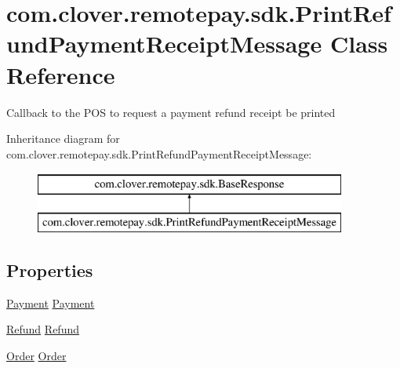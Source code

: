 \hypertarget{classcom_1_1clover_1_1remotepay_1_1sdk_1_1_print_refund_payment_receipt_message}{}\section{com.\+clover.\+remotepay.\+sdk.\+Print\+Refund\+Payment\+Receipt\+Message Class Reference}
\label{classcom_1_1clover_1_1remotepay_1_1sdk_1_1_print_refund_payment_receipt_message}


Callback to the P\+OS to request a payment refund receipt be printed  


Inheritance diagram for com.\+clover.\+remotepay.\+sdk.\+Print\+Refund\+Payment\+Receipt\+Message\+:\begin{figure}[H]
\begin{center}
\leavevmode
\includegraphics[height=2.000000cm]{classcom_1_1clover_1_1remotepay_1_1sdk_1_1_print_refund_payment_receipt_message}
\end{center}
\end{figure}
\subsection*{Properties}
\begin{DoxyCompactItemize}
\item 
\hyperlink{classcom_1_1clover_1_1sdk_1_1v3_1_1payments_1_1_payment}{Payment} \hyperlink{classcom_1_1clover_1_1remotepay_1_1sdk_1_1_print_refund_payment_receipt_message_a8247998f4e3f9748ece563f49c0f78ec}{Payment}
\item 
\hyperlink{classcom_1_1clover_1_1sdk_1_1v3_1_1payments_1_1_refund}{Refund} \hyperlink{classcom_1_1clover_1_1remotepay_1_1sdk_1_1_print_refund_payment_receipt_message_af5134cd99b8a029446d3311c877b1ad7}{Refund}
\item 
\hyperlink{classcom_1_1clover_1_1sdk_1_1v3_1_1order_1_1_order}{Order} \hyperlink{classcom_1_1clover_1_1remotepay_1_1sdk_1_1_print_refund_payment_receipt_message_ac7ce4bee64504c338f06e399eeb900e2}{Order}
\end{DoxyCompactItemize}
